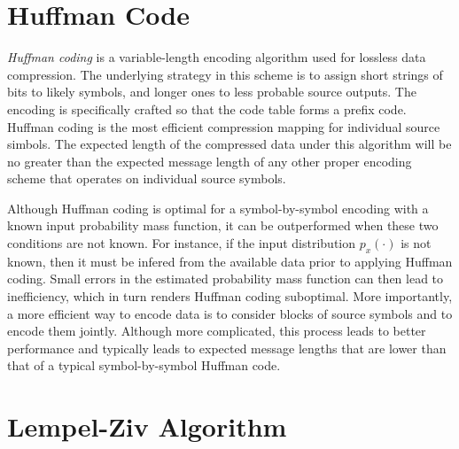 \section{Huffman Code}

\emph{Huffman coding} is a variable-length encoding algorithm used for lossless data compression.
The underlying strategy in this scheme is to assign short strings of bits to likely symbols, and longer ones to less probable source outputs.
The encoding is specifically crafted so that the code table forms a prefix code.
Huffman coding is the most efficient compression mapping for individual source simbols.
The expected length of the compressed data under this algorithm will be no greater than the expected message length of any other proper encoding scheme that operates on individual source symbols.



Although Huffman coding is optimal for a symbol-by-symbol encoding with a known input probability mass function, it can be outperformed when these two conditions are not known.
For instance, if the input distribution $p_x(\cdot)$ is not known, then it must be infered from the available data prior to applying Huffman coding.
Small errors in the estimated probability mass function can then lead to inefficiency, which in turn renders Huffman coding suboptimal.
More importantly, a more efficient way to encode data is to consider blocks of source symbols and to encode them jointly.
Although more complicated, this process leads to better performance and typically leads to expected message lengths that are lower than that of a typical symbol-by-symbol Huffman code.


\section{Lempel-Ziv Algorithm}

